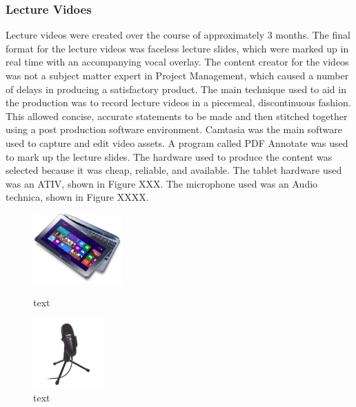 \documentclass[a4paper]{article}
\begin{document}
\subsubsection{Lecture Vidoes}
Lecture videos were created over the course of approximately 3 months. The final format for the lecture videos was faceless lecture slides, which were marked up in real time with an accompanying vocal overlay. The content creator for the videos was not a subject matter expert in Project Management, which caused a number of delays in producing a satisfactory product. The main technique used to aid in the production was to record lecture videos in a piecemeal, discontinuous fashion. This allowed concise, accurate statements to be made and then stitched together using a post production software environment. Camtasia was the main software used to capture and edit video assets. A program called PDF Annotate was used to mark up the lecture slides. The hardware used to produce the content was selected because it was cheap, reliable, and available. The tablet hardware used was an ATIV, shown in Figure XXX. The microphone used was an Audio technica, shown in Figure XXXX.

\begin{figure}[h]
\begin{minipage}{0.45\textwidth}
\centering
\includegraphics[height=100px]{ativ}
\caption{text}
\end{minipage}
\hspace{1cm}
\begin{minipage}{0.45\textwidth}
\centering
\includegraphics[height=100px]{microphone}
\caption{text}
\end{minipage}
\end{figure}
\end{document}
